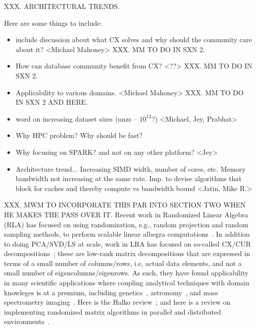 XXX.  ARCHITECTURAL TRENDS.


Here are some things to include:
\begin{itemize}

\item include discussion about what CX solves and why should the community care about it? <Michael Mahoney>  XXX.  MM TO DO IN SXN 2.

\item How can database community benefit from CX? <??>  XXX.  MM TO DO IN SXN 2.

\item Applicability to various domains. <Michael Mahoney>  XXX.  MM TO DO IN SXN 2 AND HERE.

\item word on increasing dataset sizes (nnzs -- $10^{12}$?)  <Michael, Jey, Prabhat>

 \item Why HPC problem? Why should be fast?

\item Why focusing on SPARK? and not on any other platform? <Jey>

\item Architecture trend... Increasing SIMD width, number of cores, etc. Memory bandwidth not increasing at the same rate. Imp. to devise algorithms that block for caches and thereby compute vs bandwidth bound <Jatin, Mike R.>
    
\end{itemize}


XXX.  MWM TO INCORPORATE THIS PAR INTO SECTION TWO WHEN HE MAKES THE PASS OVER IT.
Recent work in Randomized Linear Algebra (RLA) has focused on using randomization, e.g., random projection and random sampling methods, to perform scalable linear albegra computations~\cite{Mah-mat-rev_BOOK}.
In addition to doing PCA/SVD/LS at scale, work in LRA has focused on so-called CX/CUR decompositions~\cite{DMM08,CUR_PNAS}; these are low-rank matrix decompositions that are expressed in terms of a small number of columns/rows, i.e, actual data elements, and not a small number of eigencolumns/eigenrows.
As such, they have found applicability in many scientific applications where coupling analytical techniques with domain knowleges is at a premium, including genetics~\cite{Paschou07b}, astronomy~\cite{Yip14-AJ}, and mass spectrometry imaging~\cite{YRPMB15}.
Here is the Halko review~\cite{HMT09_SIREV}; and here is a review on implementing randomized matrix algorithms in parallel and distributed environments~\cite{YMM15_TR}.



